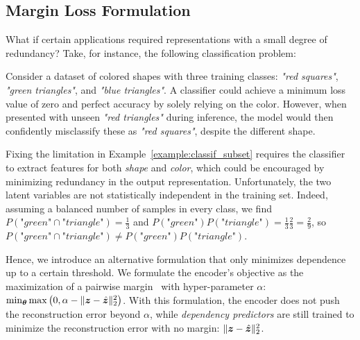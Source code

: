 \subsection{Margin Loss Formulation} \label{subsec:margin_formulation}

What if certain applications required representations with a small degree of redundancy? 
Take, for instance, the following classification problem: %
\begin{example} \label{example:classif_subset}
    Consider a dataset of colored shapes with three training classes: \textit{"red squares"}, \textit{"green triangles"}, and \textit{"blue triangles"}. 
    A classifier could achieve a minimum loss value of zero and perfect accuracy by solely relying on the color.
    However, when presented with unseen \textit{"red triangles"} during inference, the model would then confidently misclassify these as \textit{"red squares"}, despite the different shape. 
\end{example}
Fixing the limitation in Example~\ref{example:classif_subset} requires the classifier to extract features for both \textit{shape} and \textit{color}, which could be encouraged by minimizing redundancy in the output representation. 
Unfortunately, the two latent variables are not statistically independent in the training set. Indeed, assuming a balanced number of samples in every class, we find $P(\textit{"green"} \cap \textit{"triangle"}) = \frac{1}{3}$ and $ P(\textit{"green"})P(\textit{"triangle"}) = \frac{1}{3}\frac{2}{3} = \frac{2}{9}$, so $P(\textit{"green"} \cap \textit{"triangle"}) \neq P(\textit{"green"})P(\textit{"triangle"})$.


Hence, we introduce an alternative formulation that only minimizes dependence up to a certain threshold. 
We formulate the encoder's objective as the maximization of a pairwise margin~\citep{cortes1995svn_margin, tsochantaridis2005large_margin} with hyper-parameter $\alpha$: 
$\min_{{\bm{\theta}}} \max \left(0, \alpha  - \lVert {\bm{z}} - \hat{{\bm{z}}} \rVert_2^2\right)$. 
With this formulation, the encoder does not push the reconstruction error beyond $\alpha$, while \textit{dependency predictors} are still trained to minimize the reconstruction error with no margin: $\lVert {\bm{z}} - \hat{{\bm{z}}} \rVert_2^2$.

